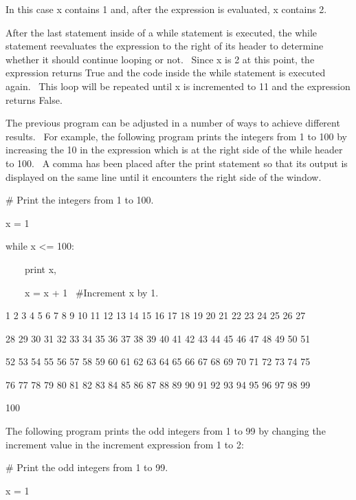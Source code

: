 \documentclass[12pt,twoside]{book}
\begin{document}
\bigskip

In this case x contains 1 and, after the expression is evaluated, x
contains 2.


\bigskip

After the last statement inside of a while statement is executed, the
while statement reevaluates the expression to the right of its header
to determine whether it should continue looping or not. \ Since x is 2
at this point, the expression returns True and the code inside the
while statement is executed again. \ This loop will be repeated until x
is incremented to 11 and the expression returns False.


\bigskip

The previous program can be adjusted in a number of ways to achieve
different results. \ For example, the following program prints the
integers from 1 to 100 by increasing the 10 in the expression which is
at the right side of the while header to 100. \ A comma has been placed
after the print statement so that its output is displayed on the same
line until it encounters the right side of the window.


\bigskip

\# Print the integers from 1 to 100.


\bigskip

x = 1 


\bigskip

while x {\textless}= 100:

\ \ \ \ print x,

\ \ \ \ x = x + 1 \ \#Increment x by 1.

{\textbar}

1 2 3 4 5 6 7 8 9 10 11 12 13 14 15 16 17 18 19 20 21 22 23 24 25 26 27

28 29 30 31 32 33 34 35 36 37 38 39 40 41 42 43 44 45 46 47 48 49 50 51

52 53 54 55 56 57 58 59 60 61 62 63 64 65 66 67 68 69 70 71 72 73 74 75

76 77 78 79 80 81 82 83 84 85 86 87 88 89 90 91 92 93 94 95 96 97 98 99

100 

The following program prints the odd integers from 1 to 99 by changing
the increment value in the increment expression from 1 to 2:


\bigskip

\# Print the odd integers from 1 to 99.


\bigskip

x = 1 
\end{document}

